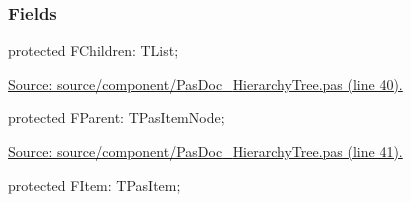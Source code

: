 \documentclass{report}
\newif\ifpdf
\begin{document}
\subsubsection*{\large{\textbf{Fields}}\normalsize\hspace{1ex}\hfill}
\begin{list}{}{
\setlength{\itemindent}{0cm}
\setlength{\listparindent}{0cm}
\setlength{\leftmargin}{\evensidemargin}
\addtolength{\leftmargin}{\tmplength}
\settowidth{\labelsep}{X}
\addtolength{\leftmargin}{\labelsep}
\setlength{\labelwidth}{\tmplength}
}
\label{PasDoc_HierarchyTree.TPasItemNode-FChildren}
\item[\textbf{FChildren}\hfill]
\ifpdf
\begin{flushleft}
\fi
\begin{ttfamily}
protected FChildren: TList;\end{ttfamily}

\ifpdf
\end{flushleft}
\fi


\par  \par
\href{https://github.com/pasdoc/pasdoc/blob/master/source/component/PasDoc_HierarchyTree.pas#L40}{Source: source/component/PasDoc{\_}HierarchyTree.pas (line 40).}\label{PasDoc_HierarchyTree.TPasItemNode-FParent}
\item[\textbf{FParent}\hfill]
\ifpdf
\begin{flushleft}
\fi
\begin{ttfamily}
protected FParent: TPasItemNode;\end{ttfamily}

\ifpdf
\end{flushleft}
\fi


\par  \par
\href{https://github.com/pasdoc/pasdoc/blob/master/source/component/PasDoc_HierarchyTree.pas#L41}{Source: source/component/PasDoc{\_}HierarchyTree.pas (line 41).}\label{PasDoc_HierarchyTree.TPasItemNode-FItem}
\item[\textbf{FItem}\hfill]
\ifpdf
\begin{flushleft}
\fi
\begin{ttfamily}
protected FItem: TPasItem;\end{ttfamily}

\ifpdf
\end{flushleft}
\fi



\end{list}
\end{document}
